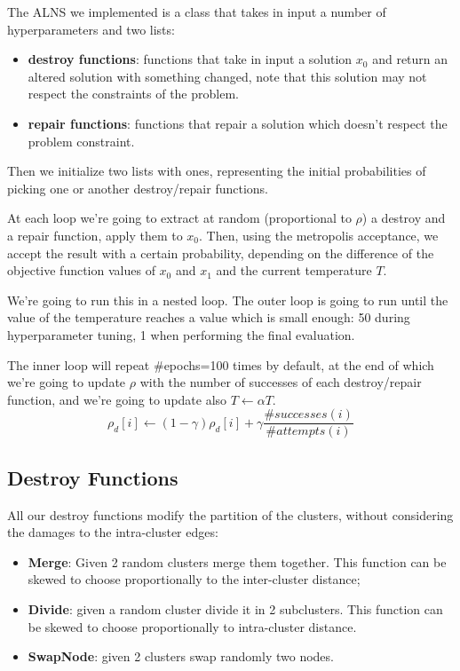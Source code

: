 \documentclass[a4paper,12pt]{article}
\begin{document}
The ALNS we implemented is a class that takes in input a number of hyperparameters and two lists:
\begin{itemize}
    \item \textbf{destroy functions}: functions that take in input a solution $x_0$ and return an altered solution with something changed, note that this solution may not respect the constraints of the problem. 
    \item \textbf{repair functions}: functions that repair a solution which doesn't respect the problem constraint.
\end{itemize}

Then we initialize two lists with ones, representing the initial probabilities of picking one or another destroy/repair functions.

At each loop we're going to extract at random (proportional to $\rho$) a destroy and a repair function, apply them to $x_0$. Then, using the metropolis acceptance, we accept the result with a certain probability, depending on the difference of the objective function values of $x_0$ and $x_1$ and the current temperature $T$.

We're going to run this in a nested loop. The outer loop is going to run until the value of the temperature reaches a value which is small enough: 50 during hyperparameter tuning, 1 when performing the final evaluation.

The inner loop will repeat \#epochs=100 times by default, at the end of which we're going to update $\rho$ with the number of successes of each destroy/repair function, and we're going to update also $T \gets \alpha T$.
$$\rho_d[i] \gets (1-\gamma) \rho_d[i] + \gamma \frac{\#successes(i)}{\#attempts(i)}$$


\subsection*{Destroy Functions}
All our destroy functions modify the partition of the clusters, without considering the damages to the intra-cluster edges:
\begin{itemize}    
    \item \textbf{Merge}: Given 2 random clusters merge them together. This function can be skewed to choose proportionally to the inter-cluster distance;
    \item \textbf{Divide}: given a random cluster divide it in 2 subclusters. This function can be skewed to choose proportionally to intra-cluster distance.
    \item \textbf{SwapNode}: given 2 clusters swap randomly two nodes.
\end{itemize}
\end{document}
